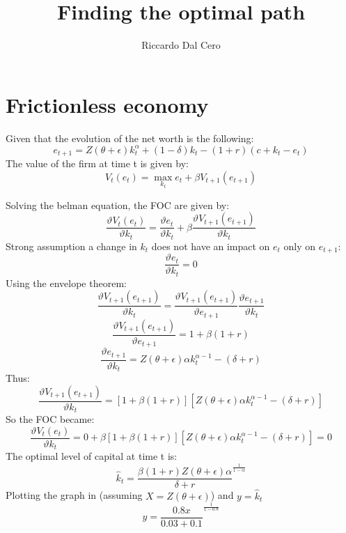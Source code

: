 \documentclass{article}
\title{Finding the optimal path}
\author{Riccardo Dal Cero}
\begin{document}
\maketitle
\section{Frictionless economy}

Given that the evolution of the net worth is the following:
\[e_{t+1} = Z(\theta +\epsilon)k_t^\alpha + (1-\delta )k_t - (1+r)(c+k_t-e_t)\]
The value of the firm at time t is given by:
\[V_t(e_t) =\max_{k_t}  e_t + \beta V_{t+1}(e_{t+1})\]

Solving the belman equation, the FOC are given by:
\[\frac{\vartheta V_t(e_t)}{\vartheta k_t } =\frac{\vartheta e_t}{\vartheta k_t } +
 \beta \frac{\vartheta V_{t+1}(e_{t+1})}{\vartheta k_t } \]
Strong assumption a change in \(k_t\) does not have an impact on \(e_t\) only on \(e_{t+1}\):
\[\frac{\vartheta e_t}{\vartheta k_t} = 0\]
Using the envelope theorem:
\[\frac{\vartheta
V_{t+1}(e_{t+1})}{\vartheta k_t } = \frac{\vartheta
V_{t+1}(e_{t+1})}{\vartheta e_{t+1} }\frac{\vartheta e_{t+1}}{\vartheta k_t}\]
\[\frac{\vartheta V_{t+1}(e_{t+1})}{\vartheta e_{t+1} } =1 + \beta(1+r)\]
\[\frac{\vartheta e_{t+1}}{\vartheta k_t} = Z(\theta +\epsilon)\alpha k_t^{\alpha-1}
-(\delta + r)\]
Thus:
\[\frac{\vartheta V_{t+1}(e_{t+1})}{\vartheta k_t } = 
[1+\beta(1+r)] [Z(\theta + \epsilon)\alpha k_t^{\alpha-1}-(\delta + r)] \]
So the FOC became:
\[\frac{\vartheta V_t(e_t)}{\vartheta k_t } = 0 + \beta [1+\beta(1+r)] [Z(\theta + \epsilon)\alpha
k_t^{\alpha-1}-(\delta + r)]  = 0 \]
The optimal level of capital at time t is:
\[\widehat{k} _t= {\frac{\beta(1+r) Z(\theta +\epsilon)\alpha}{\delta + r}}^{\frac{1}{1-\alpha}} \]
Plotting the graph in (assuming \(X=Z(\theta +\epsilon)\)) and \(y=\widehat{k} _t\)
\[ y={\frac{0.8 x}{0.03+0.1}}^{\frac{1}{1-0.8}}\]
\end{document}

